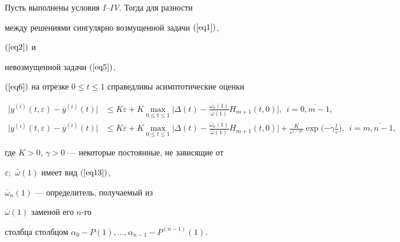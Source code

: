 \begin{thm}


Пусть выполнены условия {\em I--IV}. Тогда для разности 


между решениями сингулярно возмущенной задачи $(\ref{eq1})$,


$(\ref{eq2})$ и 


невозмущенной задачи $(\ref{eq5})$, 


$(\ref{eq6})$ на отрезке $0 \le t \le 1$ справедливы асимптотические оценки


\begin{align*}


{\big| {y^{(i)}(t,\varepsilon ) - \overline {y}^{(i)}(t)} \big|} &\le 


K\varepsilon + K \max_{0 \le t \le 1} {\bigg| {\Delta (t) 


- {\frac{{\overline {\omega} _{n} (1)}}{{\overline {\omega} (1)}}}H_{m + 


1} (t,0)} 


\bigg|},\ \ i = \overline {0,m - 1}, \\


%


{\big| {y^{(i)}(t,\varepsilon ) - \overline {y}^{(i)}(t)} \big|} &\le 


K\varepsilon + K\max_{0 \le t \le 1} {\bigg| {\Delta (t) 


- {\frac{{\overline {\omega} _{n} (1)}}{{\overline {\omega} (1)}}}H_{m + 


1} (t,0)} 


\bigg|} + {\frac{{K}}{{\varepsilon ^{i - m}}}}\exp \bigg( { - \gamma 


{\frac{{t}}{{\varepsilon}} }} \bigg),\ \ 


i = \overline {m,n - 1,} 


\end{align*}


где $K > 0$, $\gamma > 0$ --- некоторые постоянные, не зависящие от 


$\varepsilon;$ $\overline{\omega}(1)$ имеет вид $(\ref{eq13})$, 


$\overline {\omega} _{n}(1)$ --- определитель, получаемый из 


$\overline {\omega} (1)$ заменой его $n$-го 


столбца столбцом $\alpha _{0}-P(1),\dotsc, \alpha _{n-1}-P^{(n-1)}(1)$.


\end{thm}





